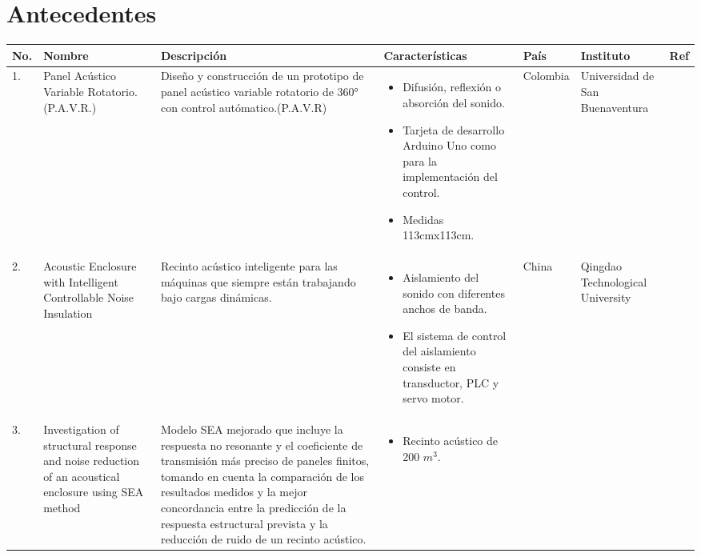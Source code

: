 \section*{Antecedentes}


\begin{center}
\scriptsize
\begin{longtable}[!htb]{ | m{2em} | m{10em} | m{10em} | m{10em} | m{5em} | m{8em} |m{2em} |}
\hline
\textbf{No.} & \textbf{Nombre} & \textbf{Descripción} & \textbf{Características} & \textbf{País} & \textbf{Instituto} & \textbf{Ref} \\
\hline
 1. & Panel
Acústico Variable Rotatorio. (P.A.V.R.) & Diseño y construcción de un prototipo de panel acústico variable rotatorio de 360° con control autómatico.(P.A.V.R) & 
\begin{itemize}
    \item Difusión, reflexión o absorción del sonido.
    \item Tarjeta de desarrollo Arduino Uno como para la implementación del control.
    \item Medidas 113cmx113cm.
\end{itemize}
& Colombia & Universidad de San Buenaventura & \cite{O.J.Mantilla}\\
\hline
 2. & Acoustic Enclosure with Intelligent Controllable Noise Insulation & Recinto acústico inteligente para las máquinas que siempre están trabajando bajo cargas dinámicas. & 
 \begin{itemize}
    \item Aislamiento del sonido con diferentes anchos de banda.
    \item El sistema de control del aislamiento consiste en transductor, PLC y servo motor.
\end{itemize} 
& China  & Qingdao Technological University  & \cite{L.Sen}\\
\hline
 3. & Investigation of structural response and noise reduction of an acoustical enclosure using SEA method &  Modelo SEA mejorado que incluye la respuesta no resonante y el coeficiente de transmisión más preciso de paneles finitos, tomando en cuenta la comparación de los resultados medidos y la mejor concordancia entre la predicción de la respuesta estructural prevista y la reducción de ruido de un recinto acústico. & 
\begin{itemize}
    \item Recinto acústico de 200 $m^3$.

\end{itemize}
\end{longtable}
\end{center}
